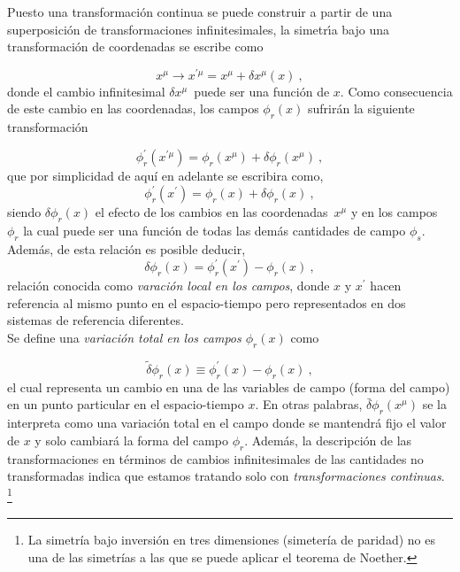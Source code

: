 \noindent
Puesto una transformaci\'{o}n continua se puede construir a partir de una superposici\'{o}n de transformaciones infinitesimales, la simetr\'{\i}a bajo una transformaci\'{o}n de coordenadas se escribe como

\begin{equation}
x^{\mu }\rightarrow x^{\prime \mu }=x^{\mu }+\delta x^{\mu }\left( x\right)
~,  \label{2.36}
\end{equation}
donde el cambio infinitesimal $\delta x^{\mu }$\ puede ser una funci\'{o}n de $x$. Como consecuencia de este cambio en las coordenadas, los campos $\phi _{r}\left( x\right) $ sufrir\'{a}n la siguiente transformaci\'{o}n

\begin{equation}
\phi _{r}^{\prime }\left( x^{\prime \mu }\right) =\phi _{r}\left( x^{\mu
}\right) +\delta \phi _{r}\left( x^{\mu }\right) ~,  
\end{equation}
\noindent
que por simplicidad de aquí en adelante se escribira como,
\begin{equation}
\phi _{r}^{\prime }\left( x^{\prime}\right) =\phi _{r}\left(x\right) +\delta \phi _{r}\left( x\right) ~,  \label{2.37}
\end{equation}
\noindent
siendo $\delta \phi _{r}\left( x\right) $ el efecto de los cambios en las coordenadas\ $x^{\mu }$ y en los campos $\phi _{r}$ la cual puede ser una funci\'{o}n de todas las dem\'{a}s cantidades de campo $\phi _{s}$. Además, de esta relación es posible deducir,
\begin{equation}
\delta \phi _{r}\left( x\right) =\phi _{r}^{\prime }\left( x^{\prime}\right)-\phi _{r}\left(x\right)~,  
\label{2.37_a}
\end{equation}
\noindent
relación conocida como \emph{varación local en los campos}, donde $x$ y $x^{\prime}$ hacen referencia al mismo punto en el espacio-tiempo pero representados en dos sistemas de referencia diferentes.\\

\noindent
Se define una \emph{variación total en los campos $\phi_{r}(x)$} como

\begin{equation}
\tilde{\delta}\phi _{r}\left( x\right) \equiv \phi _{r}^{\prime }\left( x\right) - \phi _{r}\left( x\right) ~,  \label{2.38}
\end{equation}
\noindent
el cual representa un cambio en una de las variables de campo (forma del campo) en un punto particular en el espacio-tiempo $x$. En otras palabras, $\bar{\delta}\phi _{r}\left( x^{\mu }\right) $ se la interpreta como una variación total en el campo donde se mantendrá fijo el valor de $x$ y solo cambiará la forma del campo $\phi_{r}$. Además, la descripci\'{o}n de las transformaciones en t\'{e}rminos de cambios infinitesimales de las cantidades no transformadas indica que estamos tratando solo con \emph{transformaciones continuas}. \footnote{La simetría bajo inversión en tres dimensiones (simetería de paridad) no es una de las simetrías a las que se puede aplicar el teorema de Noether.}

